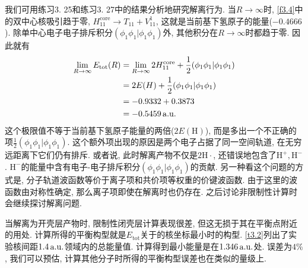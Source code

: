 我们可用练习3.
25和练习3.
27中的结果分析地研究解离行为. 
当$R\to\infty$时, 
\ref{f3.4}中的双中心核吸引趋于零, 
$H_{11}^\mathrm{core}\to T_{11}+V_{11}^1$, 
这就是当前基下氢原子的能量($-0.4666$). 
除单中心电子电子排斥积分$(\phi_1\phi_1|\phi_1\phi_1)$外, 
其他积分在$R\to \infty$时都趋于零. 
因此就有
\begin{align*}
	\lim_{R\to\infty} E_\mathrm{tot}(R) & = \lim_{R\to\infty} 2H_{11}^\mathrm{core} + \frac{1}{2}(\phi_1\phi_1|\phi_1\phi_1) \\
	& = 2E(H) + \frac{1}{2}(\phi_1\phi_1|\phi_1\phi_1)                                   \\
	& = -0.9332 + 0.3873                                                                 \\
	& = -0.5459\,\mathrm{a.u.}
\end{align*}
这个极限值不等于当前基下氢原子能量的两倍($2E(\mathrm{H})$), 
而是多出一个不正确的项$\frac{1}{2}(\phi_1\phi_1|\phi_1\phi_1)$. 
这个额外项出现的原因是两个电子占据了同一空间轨道, 
在无穷远距离下它们仍有排斥. 
或者说, 此时解离产物不仅是$2\mathrm{H}\cdot$, 
还错误地包含了$\mathrm{H}^+,\mathrm{H}^-$. 
$\mathrm{H}^-$的能量中含有电子-电子排斥积分$(\phi_1\phi_1|\phi_1\phi_1)$的贡献. 
另一种看这个问题的方式是, 
分子轨道波函数等价于离子项和共价项等权重的价键波函数. 
由于这里的波函数由对称性确定, 
那么离子项即使在解离时也仍存在. 
之后讨论非限制性\hft 计算时会继续探讨解离问题.


当解离为开壳层产物时, 
限制性闭壳层\hft 计算表现很差, 
但这无损于其在平衡点附近的用处. 
计算所得的平衡构型就是$E_\mathrm{tot}$关于的核坐标最小时的构型. 
\ref{t3.2}列出了实验核间距$1.4\,\mathrm{a.u.}$领域内的总能量值. 
计算得到最小能量是在$1.346\,\mathrm{a.u.}$处. 
误差为$4\%$, 
我们可以预估, 
计算其他分子时所得的平衡构型误差也在类似的量级上. 

